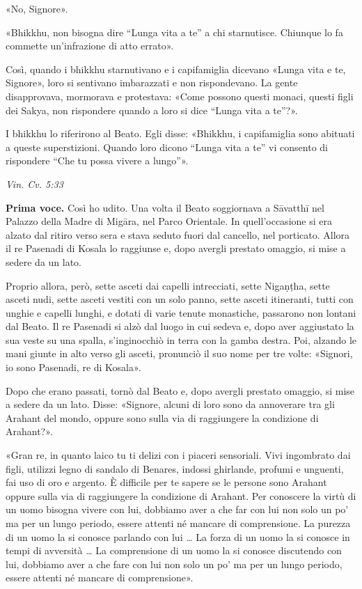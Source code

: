 «No, Signore».


«Bhikkhu, non bisogna dire “Lunga vita a te” a chi starnutisce. Chiunque
lo fa commette un’infrazione di atto errato».


Così, quando i bhikkhu starnutivano e i capifamiglia dicevano «Lunga
vita e te, Signore», loro si sentivano imbarazzati e non rispondevano.
La gente disapprovava, mormorava e protestava: «Come possono questi
monaci, questi figli dei Sakya, non rispondere quando a loro si dice
“Lunga vita a te”?».


I bhikkhu lo riferirono al Beato. Egli disse: «Bhikkhu, i capifamiglia
sono abituati a queste superstizioni. Quando loro dicono “Lunga vita a
te” vi consento di rispondere “Che tu possa vivere a lungo”».


\emph{Vin. Cv. 5:33}


\textbf{Prima voce.} Così ho udito. Una volta il Beato soggiornava a Sāvatthī nel
Palazzo della Madre di Migāra, nel Parco Orientale. In quell’occasione
si era alzato dal ritiro verso sera e stava seduto fuori dal cancello,
nel porticato. Allora il re Pasenadi di Kosala lo raggiunse e, dopo
avergli prestato omaggio, si mise a sedere da un lato.


Proprio allora, però, sette asceti dai capelli intrecciati, sette
Nigaṇṭha, sette asceti nudi, sette asceti vestiti con un solo panno,
sette asceti itineranti, tutti con unghie e capelli lunghi, e dotati di
varie tenute monastiche, passarono non lontani dal Beato. Il re Pasenadi
si alzò dal luogo in cui sedeva e, dopo aver aggiustato la sua veste su
una spalla, s’inginocchiò in terra con la gamba destra. Poi, alzando le
mani giunte in alto verso gli asceti, pronunciò il suo nome per tre
volte: «Signori, io sono Pasenadi, re di Kosala».


Dopo che erano passati, tornò dal Beato e, dopo avergli prestato
omaggio, si mise a sedere da un lato. Disse: «Signore, alcuni di loro
sono da annoverare tra gli Arahant del mondo, oppure sono sulla via di
raggiungere la condizione di Arahant?».


«Gran re, in quanto laico tu ti delizi con i piaceri sensoriali. Vivi
ingombrato dai figli, utilizzi legno di sandalo di Benares, indossi
ghirlande, profumi e unguenti, fai uso di oro e argento. È difficile per
te sapere se le persone sono Arahant oppure sulla via di raggiungere la
condizione di Arahant. Per conoscere la virtù di un uomo bisogna vivere
con lui, dobbiamo aver a che far con lui non solo un po’ ma per un lungo
periodo, essere attenti né mancare di comprensione. La purezza di un
uomo la si conosce parlando con lui … La forza di un uomo la si conosce
in tempi di avversità … La comprensione di un uomo la si conosce
discutendo con lui, dobbiamo aver a che fare con lui non solo un po’ ma
per un lungo periodo, essere attenti né mancare di comprensione».


